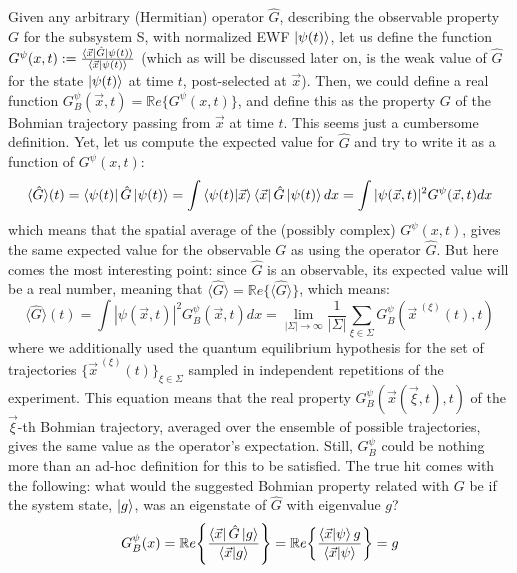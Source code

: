 \documentclass[11pt, a4paper]{article} %
\begin{document}
Given any arbitrary (Hermitian) operator $\hat{G}$, describing the observable property $G$ for the subsystem S, with normalized EWF $\ket{\psi(t)}$, let us define the function $G^{\psi}(x,t):=\frac{\bra{\vec{x}}\hat{G}\ket{\psi(t)}}{\bra{\vec{x}}\ket{\psi(t)}}$ (which as will be discussed later on, is the weak value \cite{Weak} of $\hat{G}$ for the state $\ket{\psi(t)}$ at time $t$, post-selected at $\vec{x}$). Then, we could define a real function $G_B^\psi(\vec{x},t)=\mathbb{R}e\{G^{\psi}(x,t)\}$, and define this as the property $G$ of the Bohmian trajectory passing from $\vec{x}$ at time $t$. This seems just a cumbersome definition. Yet, let us compute the expected value for $\hat{G}$ and try to write it as a function of $G^\psi(x,t)$:
\begin{equation}
\langle \hat{G}\rangle(t)= \bra{\psi(t)}\hat{G}\ket{\psi(t)}=\int \bra{\psi(t)} \ket{\vec{x}}\bra{\vec{x}}\hat{G}\ket{\psi(t)}dx =  \int |\psi(\vec{x},t)|^2G^\psi(\vec{x},t)dx
\end{equation}
which means that the spatial average of the (possibly complex) $G^\psi(x,t)$, gives the same expected value for the observable $G$ as using the operator $\hat{G}$. But here comes the most interesting point: since $\hat{G}$ is an observable, its expected value will be a real number, meaning that $\langle \hat{G}\rangle=\mathbb{R}e\{\langle \hat{G}\rangle\}$, which means:
\begin{equation}
\langle \hat{G}\rangle(t)=\int |\psi(\vec{x},t)|^2G_B^\psi(\vec{x},t)dx= \lim_{|\Sigma|\rightarrow \infty}\frac{1}{|\Sigma|} \sum_{\xi\in\Sigma} G_B^\psi(\vec{x}^{\:(\xi)}(t),t)
\end{equation}
where we additionally used the quantum equilibrium hypothesis \cite{Absolute} for the set of trajectories $\{\vec{x}^{\:(\xi)}(t)\}_{\xi\in\Sigma}$ sampled in independent repetitions of the experiment. This equation means that the real property $G_B^\psi(\vec{x}(\vec{\xi},t),t)$ of the $\vec{\xi}$-th Bohmian trajectory, averaged over the ensemble of possible trajectories, gives the same value as the operator's expectation. Still, $G^\psi_B$ could be nothing more than an ad-hoc definition for this to be satisfied. The true hit comes with the following: what would the suggested Bohmian property related with $G$ be if the system state, $\ket{g}$, was an eigenstate of $\hat{G}$ with eigenvalue $g$?
\begin{equation}
G_B^\psi(x)=\mathbb{R}e\qty{ \frac{\bra{\vec{x}}\hat{G}\ket{g}}{\bra{\vec{x}}\ket{g}} } = \mathbb{R}e\qty{ \frac{\bra{\vec{x}}\ket{\psi}g}{\bra{\vec{x}}\ket{\psi}} }=g
\end{equation}
\end{document}
